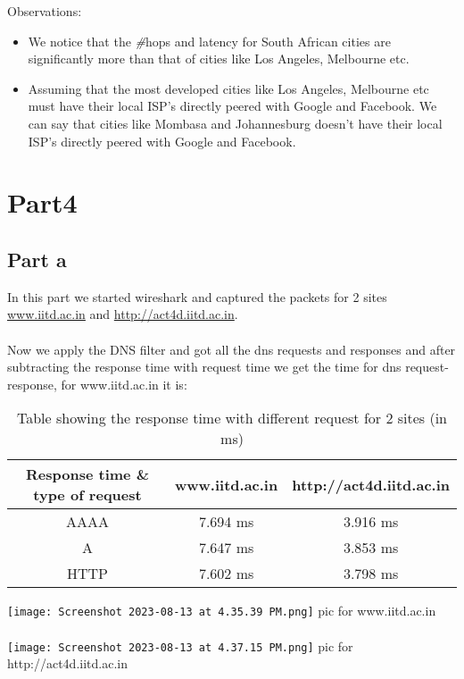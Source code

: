 \documentclass[11pt]{scrartcl}
\begin{document}
Observations:
\begin{itemize}
    \item We notice that the \textit{\#}hops and latency for South African cities are significantly more than that of cities like Los Angeles, Melbourne etc.
    \item Assuming that the most developed cities like Los Angeles, Melbourne etc must have their local ISP's directly peered with Google and Facebook. We can say that cities like Mombasa and Johannesburg doesn't have their local ISP's directly peered with Google and Facebook.
\end{itemize}

\newpage
\section{Part4}
\subsection{Part a}
In this part we started wireshark and captured the packets for 2 sites \underline{www.iitd.ac.in} and \underline{http://act4d.iitd.ac.in}.\\ \\
Now we apply the DNS filter and got all the dns requests and responses and after subtracting the response time with request time we get the time for dns request-response, for www.iitd.ac.in it is:



\begin{table}[ht]
\centering
\begin{tabular}{|c|c|c|}
\hline
Response time \& type of request & www.iitd.ac.in & http://act4d.iitd.ac.in \\
\hline
AAAA & 7.694 ms & 3.916 ms  \\
\hline
A & 7.647 ms & 3.853 ms \\
\hline
HTTP &  7.602 ms & 3.798 ms\\
\hline
\end{tabular}
\caption{Table showing the response time with different request for 2 sites (in ms)}
\label{tab:simple}
\end{table}




\texttt{[image: Screenshot 2023-08-13 at 4.35.39 PM.png]}
pic for www.iitd.ac.in\\ \\
\texttt{[image: Screenshot 2023-08-13 at 4.37.15 PM.png]}
pic for http://act4d.iitd.ac.in
\end{document}
